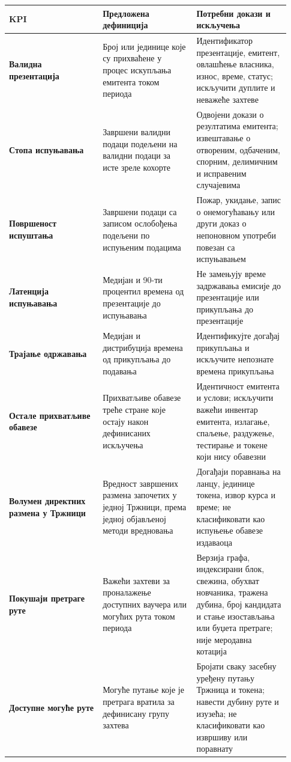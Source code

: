 \documentclass[11pt]{article}
\begin{document}
\begin{longtable}{P{0.31\linewidth} P{0.31\linewidth} P{0.31\linewidth}}
\toprule
KPI & Предложена дефиниција & Потребни докази и искључења \\
\midrule
\endhead
\textbf{Валидна презентација} & Број или јединице које су прихваћене у процес искупљања емитента током периода & Идентификатор презентације, емитент, овлашћење власника, износ, време, статус; искључити дуплите и неважеће захтеве \\
\textbf{Стопа испуњавања} & Завршени валидни подаци подељени на валидни подаци за исте зреле кохорте & Одвојени докази о резултатима емитента; извештавање о отвореним, одбаченим, спорним, делимичним и исправеним случајевима \\
\textbf{Површеност испуштања} & Завршени подаци са записом ослобођења подељени по испуњеним подацима & Пожар, укидање, запис о онемогућавању или други доказ о непоновном употреби повезан са испуњавањем \\
\textbf{Латенција испуњавања} & Медијан и 90-ти процентил времена од презентације до испуњавања & Не замењују време задржавања емисије до презентације или прикупљања до презентације \\
\textbf{Трајање одржавања} & Медијан и дистрибуција времена од прикупљања до подавања & Идентификујте догађај прикупљања и искључите непознате времена прикупљања \\
\textbf{Остале прихватљиве обавезе} & Прихватљиве обавезе треће стране које остају након дефинисаних искључења & Идентичност емитента и услови; искључити важећи инвентар емитента, излагање, спаљење, раздужење, тестирање и токене који нису обавезни \\
\textbf{Волумен директних размена у Тржници} & Вредност завршених размена започетих у једној Тржници, према једној објављеној методи вредновања & Догађаји поравнања на ланцу, јединице токена, извор курса и време; не класификовати као испуњење обавезе издаваоца \\
\textbf{Покушаји претраге руте} & Важећи захтеви за проналажење доступних ваучера или могућих рута током периода & Верзија графа, индексирани блок, свежина, обухват новчаника, тражена дубина, број кандидата и стање изостављања или буџета претраге; није меродавна котација \\
\textbf{Доступне могуће руте} & Могуће путање које је претрага вратила за дефинисану групу захтева & Бројати сваку засебну уређену путању Тржница и токена; навести дубину руте и изузећа; не класификовати као извршиву или поравнату \\

\end{longtable}
\end{document}
